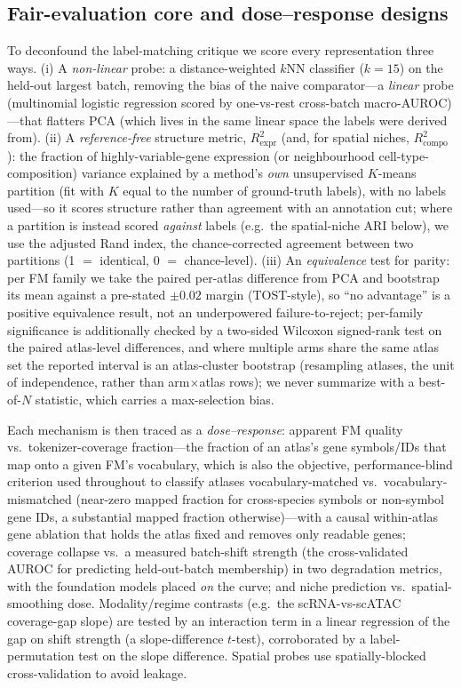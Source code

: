 \documentclass[11pt]{article}
\begin{document}
\subsection{Fair-evaluation core and dose--response designs}
To deconfound the label-matching critique we score every representation three ways. (i) A \emph{non-linear} probe: a distance-weighted $k$NN classifier ($k{=}15$) on the held-out largest batch, removing the bias of the naive comparator---a \emph{linear} probe (multinomial logistic regression scored by one-vs-rest cross-batch macro-AUROC)---that flatters PCA (which lives in the same linear space the labels were derived from). (ii) A \emph{reference-free} structure metric, $R^2_{\mathrm{expr}}$ (and, for spatial niches, $R^2_{\mathrm{compo}}$): the fraction of highly-variable-gene expression (or neighbourhood cell-type-composition) variance explained by a method's \emph{own} unsupervised $K$-means partition (fit with $K$ equal to the number of ground-truth labels), with no labels used---so it scores structure rather than agreement with an annotation cut; where a partition is instead scored \emph{against} labels (e.g.\ the spatial-niche ARI below), we use the adjusted Rand index, the chance-corrected agreement between two partitions (1 $=$ identical, 0 $=$ chance-level). (iii) An \emph{equivalence} test for parity: per FM family we take the paired per-atlas difference from PCA and bootstrap its mean against a pre-stated $\pm0.02$ margin (TOST-style), so ``no advantage'' is a positive equivalence result, not an underpowered failure-to-reject; per-family significance is additionally checked by a two-sided Wilcoxon signed-rank test on the paired atlas-level differences, and where multiple arms share the same atlas set the reported interval is an atlas-cluster bootstrap (resampling atlases, the unit of independence, rather than arm$\times$atlas rows); we never summarize with a best-of-$N$ statistic, which carries a max-selection bias.

Each mechanism is then traced as a \emph{dose--response}: apparent FM quality vs.\ tokenizer-coverage fraction---the fraction of an atlas's gene symbols/IDs that map onto a given FM's vocabulary, which is also the objective, performance-blind criterion used throughout to classify atlases vocabulary-matched vs.\ vocabulary-mismatched (near-zero mapped fraction for cross-species symbols or non-symbol gene IDs, a substantial mapped fraction otherwise)---with a causal within-atlas gene ablation that holds the atlas fixed and removes only readable genes; coverage collapse vs.\ a measured batch-shift strength (the cross-validated AUROC for predicting held-out-batch membership) in two degradation metrics, with the foundation models placed \emph{on} the curve; and niche prediction vs.\ spatial-smoothing dose. Modality/regime contrasts (e.g.\ the scRNA-vs-scATAC coverage-gap slope) are tested by an interaction term in a linear regression of the gap on shift strength (a slope-difference $t$-test), corroborated by a label-permutation test on the slope difference. Spatial probes use spatially-blocked cross-validation to avoid leakage.
\end{document}
